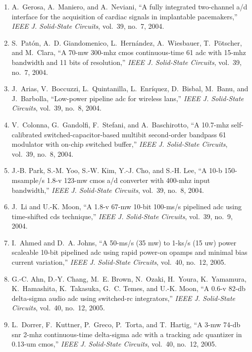 \begin{enumerate}
\item
A.~Gerosa, A.~Maniero, and A.~Neviani, ``A fully integrated two-channel a/d
  interface for the acquisition of cardiac signals in implantable pacemakers,''
  \emph{{IEEE} J. Solid-State Circuits}, vol.~39, no.~7, 2004.

\item
S.~Patón, A.~D. Giandomenico, L.~Hernández, A.~Wiesbauer, T.~Pötscher, and
  M.~Clara, ``A 70-mw 300-mhz cmos continuous-time 61 adc with 15-mhz bandwidth
  and 11 bits of resolution,'' \emph{{IEEE} J. Solid-State Circuits}, vol.~39,
  no.~7, 2004.

\item
J.~Arias, V.~Boccuzzi, L.~Quintanilla, L.~Enríquez, D.~Bisbal, M.~Banu, and
  J.~Barbolla, ``Low-power pipeline adc for wireless lans,'' \emph{{IEEE} J.
  Solid-State Circuits}, vol.~39, no.~8, 2004.

\item
V.~Colonna, G.~Gandolfi, F.~Stefani, and A.~Baschirotto, ``A 10.7-mhz
  self-calibrated switched-capacitor-based multibit second-order bandpass 61
  modulator with on-chip switched buffer,'' \emph{{IEEE} J. Solid-State
  Circuits}, vol.~39, no.~8, 2004.

\item
J.-B. Park, S.-M. Yoo, S.-W. Kim, Y.-J. Cho, and S.-H. Lee, ``A 10-b
  150-msample/s 1.8-v 123-mw cmos a/d converter with 400-mhz input bandwidth,''
  \emph{{IEEE} J. Solid-State Circuits}, vol.~39, no.~8, 2004.

\item
J.~Li and U.-K. Moon, ``A 1.8-v 67-mw 10-bit 100-ms/s pipelined adc using
  time-shifted cds technique,'' \emph{{IEEE} J. Solid-State Circuits}, vol.~39,
  no.~9, 2004.

\item
I.~Ahmed and D.~A. Johns, ``A 50-ms/s (35 mw) to 1-ks/s (15 uw) power scaleable
  10-bit pipelined adc using rapid power-on opamps and minimal bias current
  variation,'' \emph{{IEEE} J. Solid-State Circuits}, vol.~40, no.~12, 2005.

\item
G.-C. Ahn, D.-Y. Chang, M.~E. Brown, N.~Ozaki, H.~Youra, K.~Yamamura,
  K.~Hamashita, K.~Takasuka, G.~C. Temes, and U.-K. Moon, ``A 0.6-v 82-db
  delta-sigma audio adc using switched-rc integrators,'' \emph{{IEEE} J.
  Solid-State Circuits}, vol.~40, no.~12, 2005.

\item
L.~Dorrer, F.~Kuttner, P.~Greco, P.~Torta, and T.~Hartig, ``A 3-mw 74-db snr
  2-mhz continuous-time delta-sigma adc with a tracking adc quantizer in
  0.13-um cmos,'' \emph{{IEEE} J. Solid-State Circuits}, vol.~40, no.~12, 2005.


\end{enumerate}
